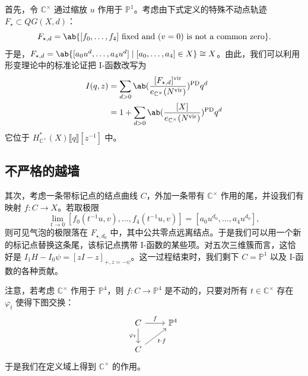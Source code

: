 \documentclass{amsart}
\theoremstyle{definition}
\theoremstyle{remark}
\theoremstyle{plain}
\theoremstyle{definition}
\theoremstyle{remark}
\newcommand{\C}{\mathbb{C}}
\renewcommand{\P}{\mathbb{P}}
\newcommand{\mr}[1]{\mathrm{#1}}
\newcommand{\1}{\mathbf{1}}
\newcommand{\2}{\mathbf{2}}
\newcommand{\3}{\mathbf{3}}
\newcommand{\vir}{\mr{vir}}
\newcommand{\ps}[1]{\llbracket #1 \rrbracket}
\begin{document}
首先，令 \(\C^{\times}\) 通过缩放 \(u\) 作用于 \(\P^1\)。考虑由下式定义的特殊不动点轨迹 \(F_{\star} \subset QG(X, d)\)：
\[ F_{\star,d} = \ab\{ [f_0, \ldots, f_4] \text{ fixed and } (v=0) \text{ is not a common zero} \}. \]
于是，\(F_{\star,d} = \ab\{ [a_0 u^d, \ldots, a_4 u^d] \mid [a_0, \ldots, a_4] \in X \} \cong X\)。由此，我们可以利用形变理论中的标准论证把 I-函数改写为
\begin{align*}
    I(q,z) &= \sum_{d > 0} \ab(\frac{[F_{\star, d}]^{\vir}}{e_{\C^{\times}}(N^{\vir})})^{\mr{PD}} q^d \\
    &= 1 + \sum_{d > 0} \ab( \frac{[X]}{e_{\C^{\times}}(N^{\vir})})^{\mr{PD}} q^d
\end{align*}
它位于 \(H^*_{\C^{\times}}(X) \ps{q}[z^{-1}]\) 中。

\subsection{不严格的越墙}%
\label{sub:Wall-crossing without rigor}


其次，考虑一条带标记点的结点曲线 \(C\)，外加一条带有 \(\C^{\times}\) 作用的尾，并设我们有映射 \(f \colon C \to X\)。若取极限
\[ \lim_{t \to 0} [f_0(t^{-1}u, v), \ldots, f_4(t^{-1}u, v)] = [a_0 u^{d_0}, \ldots, a_4 u^{d_0}], \]
则可见气泡的极限落在 \(F_{\star, d_0}\) 中，其中公共零点远离结点。于是我们可以用一个新的标记点替换这条尾，该标记点携带 I-函数的某些项。对五次三维簇而言，这恰好是 \(I_1 H - I_0 \psi = [zI-z]_{+, z = -\psi}\)。这一过程结束时，我们剩下 \(C = \P^1\) 以及 I-函数的各种贡献。

注意，若考虑 \(\C^{\times}\) 作用于 \(\P^4\)，则 \(f \colon C \to \P^4\) 是不动的，只要对所有 \(t \in \C^{\times}\) 存在 \(\varphi_t\) 使得下图交换：
\begin{equation*}
\begin{tikzcd}
    C \ar{r}{f} \ar{d}[swap]{\varphi_t} & \P^4 \\
    C \ar{ur}[swap]{t \cdot f}
\end{tikzcd}
\end{equation*}
于是我们在定义域上得到 \(\C^{\times}\) 的作用。
\end{document}
